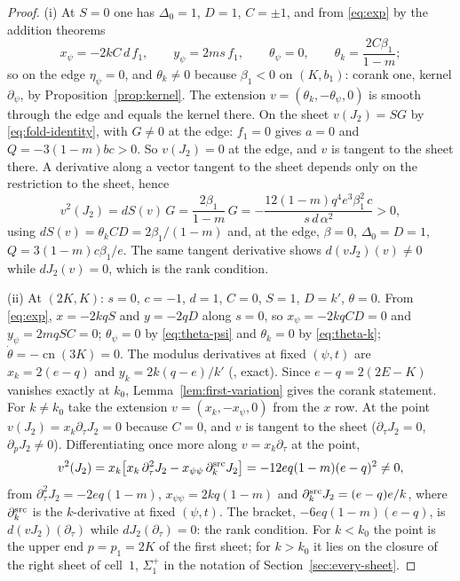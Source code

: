 \documentclass[11pt]{article}
\theoremstyle{remark}
\newcommand{\cn}{\operatorname{cn}}
\begin{document}
\begin{proof}
(i) At $S=0$ one has $\Delta_0=1$, $D=1$, $C=\pm1$, and from \eqref{eq:exp}
by the addition theorems
\[
 x_\psi=-2kC\,d\,f_1,\qquad y_\psi=2ms\,f_1,\qquad \theta_\psi=0,
 \qquad \theta_k=\frac{2C\beta_1}{1-m};
\]
so on the edge $\eta_\psi=0$, and $\theta_k\ne0$ because $\beta_1<0$ on
$(K,b_1)$: corank one, kernel $\partial_\psi$, by Proposition~\ref{prop:kernel}.
The extension $v=(\theta_k,-\theta_\psi,0)$ is smooth through the edge and
equals the kernel there.  On the sheet $v(J_2)=SG$ by
\eqref{eq:fold-identity}, with $G\ne0$ at the edge: $f_1=0$ gives $a=0$ and
$Q=-3(1-m)bc>0$.  So $v(J_2)=0$ at the edge, and $v$ is tangent to the
sheet there.  A derivative along a vector tangent to the sheet depends only
on the restriction to the sheet, hence
\[
 v^2(J_2)=dS(v)\,G=\frac{2\beta_1}{1-m}\,G
 =-\frac{12(1-m)q^4e^3\beta_1^2\,c}{s\,d\,\alpha^2}>0,
\]
using $dS(v)=\theta_kCD=2\beta_1/(1-m)$ and, at the edge, $\beta=0$,
$\Delta_0=D=1$, $Q=3(1-m)c\beta_1/e$.  The same tangent derivative shows
$d(vJ_2)(v)\ne0$ while $dJ_2(v)=0$, which is the rank condition.

(ii) At $(2K,K)$: $s=0$, $c=-1$, $d=1$, $C=0$, $S=1$, $D=k'$, $\theta=0$.
From \eqref{eq:exp}, $x=-2kqS$ and $y=-2qD$ along $s=0$, so $x_\psi=-2kqCD=0$
and $y_\psi=2mqSC=0$; $\theta_\psi=0$ by \eqref{eq:theta-psi} and
$\theta_k=0$ by \eqref{eq:theta-k}; $\dot\theta=-\cn(3K)=0$.  The modulus
derivatives at fixed $(\psi,t)$ are $x_k=2(e-q)$ and $y_k=2k(q-e)/k'$
(, exact).  Since $e-q=2(2E-K)$
vanishes exactly at $k_0$, Lemma~\ref{lem:first-variation} gives the
corank statement.  For $k\ne k_0$ take the extension $v=(x_k,-x_\psi,0)$
from the $x$ row.  At the point $v(J_2)=x_k\partial_\tau J_2=0$ because
$C=0$, and $v$ is tangent to the sheet ($\partial_\tau J_2=0$,
$\partial_pJ_2\ne0$).  Differentiating once more along $v=x_k\partial_\tau$
at the point,
\[
 v^2(J_2)=x_k\bigl[x_k\,\partial_\tau^2J_2-x_{\psi\psi}\,\partial_k^{\rm src}J_2\bigr]
 =-12eq(1-m)(e-q)^2\ne0,
\]
from $\partial^2_\tau J_2=-2eq(1-m)$, $x_{\psi\psi}=2kq(1-m)$ and
$\partial^{\rm src}_kJ_2=(e-q)e/k$, where $\partial^{\rm src}_k$ is the
$k$-derivative at fixed $(\psi,t)$.  The bracket, $-6eq(1-m)(e-q)$, is
$d(vJ_2)(\partial_\tau)$ while $dJ_2(\partial_\tau)=0$: the rank
condition.  For $k<k_0$ the point is the upper end $p=p_1=2K$ of the first
sheet; for $k>k_0$ it lies on the closure of the right sheet of cell~$1$,
$\Sigma_1^+$ in the notation of Section~\ref{sec:every-sheet}.
\end{proof}
\end{document}
